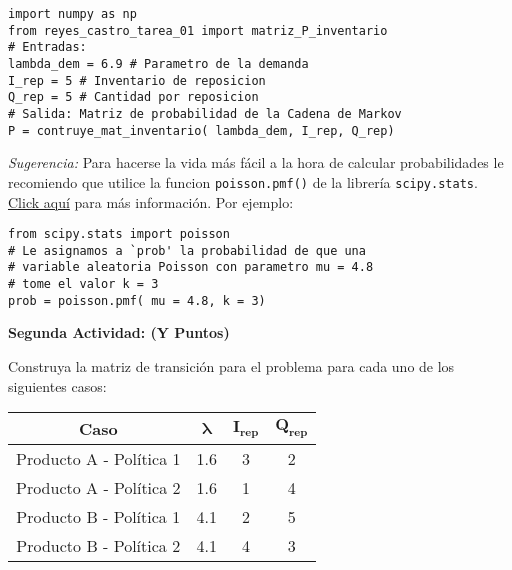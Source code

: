 \documentclass[ a4paper, twoside, 11pt]{article}
\begin{document}
\begin{problem}
\begin{center}
\begin{minipage}{0.9\textwidth}
\begin{verbatim}
import numpy as np
from reyes_castro_tarea_01 import matriz_P_inventario
# Entradas:
lambda_dem = 6.9 # Parametro de la demanda
I_rep = 5 # Inventario de reposicion
Q_rep = 5 # Cantidad por reposicion
# Salida: Matriz de probabilidad de la Cadena de Markov
P = contruye_mat_inventario( lambda_dem, I_rep, Q_rep)
\end{verbatim}
\end{minipage}
\end{center}
\fullskip

\emph{Sugerencia:} Para hacerse la vida m\'as f\'acil a la hora de calcular probabilidades le recomiendo que utilice la funcion {\tt poisson.pmf()} de la librer\'ia {\tt scipy.stats}. \href{https://docs.scipy.org/doc/scipy/reference/generated/scipy.stats.poisson.html}{Click aqu\'i} para m\'as informaci\'on. Por ejemplo: 
\halfskip

\begin{center}
\begin{minipage}{0.9\textwidth}
\begin{verbatim}
from scipy.stats import poisson
# Le asignamos a `prob' la probabilidad de que una 
# variable aleatoria Poisson con parametro mu = 4.8 
# tome el valor k = 3
prob = poisson.pmf( mu = 4.8, k = 3)
\end{verbatim}
\end{minipage}
\end{center}
\fullskip

\textbf{Segunda Actividad: (Y Puntos)}

Construya la matriz de transici\'on para el problema para cada uno de los siguientes casos: 
\begin{table}[htb]
\centering
\begin{tabular}{|c|c|c|c|}
\hline
\textbf{Caso}           & $\bm{\lambda}$ & $\bm{I_{rep}}$ & $\bm{Q_{rep}}$ \\ \hline
Producto A - Pol\'itica 1 & 1.6                & 3                  & 2                  \\ \hline
Producto A - Pol\'itica 2 & 1.6                & 1                  & 4                  \\ \hline
Producto B - Pol\'itica 1 & 4.1                & 2                  & 5                  \\ \hline
Producto B - Pol\'itica 2 & 4.1                & 4                  & 3                  \\ \hline
\end{tabular}
\end{table}


\end{problem}
\end{document}
